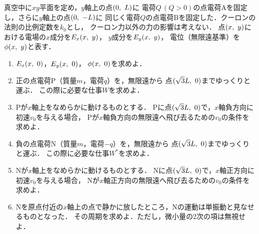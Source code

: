 ﻿\documentclass[../../../ps_q.tex]{subfiles}
\begin{document}
    真空中に$xy$平面を定め，$y$軸上の点$(0,\hspace{3.4pt} L)$に%
    電荷$Q\,(Q>0)$の点電荷Aを固定し，さらに$y$軸上の点$(0,\hspace{3.4pt} -L)$に%
    同じく電荷$Q$の点電荷Bを固定した．クーロンの法則の比例定数を$k_0$とし，%
    クーロン力以外の力の影響は考えない．%
    点$(x,\hspace{3.4pt} y)$における電場の$x$成分を$E_x(x,\hspace{3.4pt} y)$，%
    $y$成分を$E_y(x,\hspace{3.4pt} y)$，%
    電位（無限遠基準）を$\phi(x,\hspace{3.4pt} y)$と表す．%

    \begin{enumerate}
        \item%
            $E_x(x,\hspace{3.4pt} 0)$，$E_y(x,\hspace{3.4pt} 0)$，%
            $\phi(x,\hspace{3.4pt} 0)$を求めよ．
        \item%
            正の点電荷P（質量$m$，電荷$q$）を，無限遠から%
            点$(\sqrt{3}L, \hspace{3.4pt} 0)$までゆっくりと運ぶ．%
            この際に必要な仕事$W$を求めよ．
        \item%
            Pが$x$軸上をなめらかに動けるものとする．%
            Pに点$(\sqrt{3}L, \hspace{3.4pt} 0)$で，$x$軸負方向に初速$v_0$を与える場合，%
            Pが$x$軸負方向の無限遠へ飛び去るための$v_0$の条件を求めよ．
        \item%
            負の点電荷N（質量$m$，電荷$-q$）を，無限遠から%
            点$(\sqrt{3}L, \hspace{3.4pt} 0)$までゆっくりと運ぶ．%
            この際に必要な仕事$W^*$を求めよ．
        \item%
            Nが$x$軸上をなめらかに動けるものとする．%
            Nに点$(\sqrt{3}L, \hspace{3.4pt} 0)$で，$x$軸正方向に初速$v_0$を与える場合，%
            Nが$x$軸正方向の無限遠へ飛び去るための$v_0$の条件を求めよ．
        \item%
            Nを原点付近の$x$軸上の点で静かに放したところ，Nの運動は単振動と見なせるものとなった．%
            その周期を求めよ．ただし，微小量の2次の項は無視せよ．
    \end{enumerate}
\end{document}
